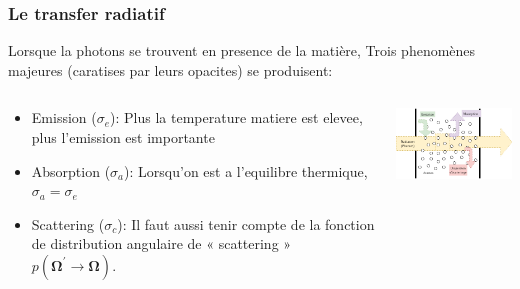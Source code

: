 \documentclass[xcolor=dvipsnames]{beamer} %
\begin{document}
\begin{frame}
  \frametitle{Le transfer radiatif}

Lorsque la photons se trouvent en presence de la matière, Trois phenomènes majeures (caratises par leurs opacites) se produisent:

\begin{columns}
  \begin{column}{0.5\textwidth}
    \footnotesize
   \begin{itemize}
     \item Emission ($\sigma_e$): Plus la temperature matiere est elevee, plus l'emission est importante %
     \item Absorption ($\sigma_a$): Lorsqu'on est a l'equilibre thermique, $\sigma_a = \sigma_e$ %
     \item Scattering ($\sigma_c$): Il faut aussi tenir compte de la fonction de distribution angulaire de « scattering » $p(\bm{\Omega^\prime \rightarrow \bm{\Omega}})$.
   \end{itemize}
  \end{column}
  \begin{column}{0.5\textwidth}
     \begin{center}
      \includegraphics[width=6cm]{TransferRadiatif}       
     \end{center}
  \end{column}
 \end{columns}
 
\end{frame}
\end{document}
